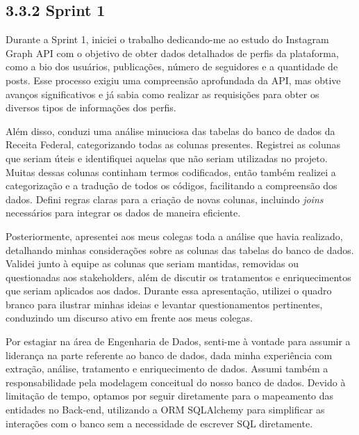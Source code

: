 \hypertarget{__RefHeading___Toc4787_3118176633}{}
\subsection*{3.3.2 Sprint 1}
\label{unit:ages-ii-sprint-1}

\indent Durante a Sprint 1, iniciei o trabalho dedicando-me ao estudo do Instagram Graph API com o objetivo de obter dados detalhados de perfis da plataforma, como a bio dos usuários, publicações, número de seguidores e a quantidade de posts. Esse processo exigiu uma compreensão aprofundada da API, mas obtive avanços significativos e já sabia como realizar as requisições para obter os diversos tipos de informações dos perfis.\par

\indent Além disso, conduzi uma análise minuciosa das tabelas do banco de dados da Receita Federal, categorizando todas as colunas presentes. Registrei as colunas que seriam úteis e identifiquei aquelas que não seriam utilizadas no projeto. Muitas dessas colunas continham termos codificados, então também realizei a categorização e a tradução de todos os códigos, facilitando a compreensão dos dados. Defini regras claras para a criação de novas colunas, incluindo \textit{joins} necessários para integrar os dados de maneira eficiente.\par

\indent Posteriormente, apresentei aos meus colegas toda a análise que havia realizado, detalhando minhas considerações sobre as colunas das tabelas do banco de dados. Validei junto à equipe as colunas que seriam mantidas, removidas ou questionadas aos stakeholders, além de discutir os tratamentos e enriquecimentos que seriam aplicados aos dados. Durante essa apresentação, utilizei o quadro branco para ilustrar minhas ideias e levantar questionamentos pertinentes, conduzindo um discurso ativo em frente aos meus colegas.\par

\indent Por estagiar na área de Engenharia de Dados, senti-me à vontade para assumir a liderança na parte referente ao banco de dados, dada minha experiência com extração, análise, tratamento e enriquecimento de dados. Assumi também a responsabilidade pela modelagem conceitual do nosso banco de dados. Devido à limitação de tempo, optamos por seguir diretamente para o mapeamento das entidades no Back-end, utilizando a ORM SQLAlchemy para simplificar as interações com o banco sem a necessidade de escrever SQL diretamente.\par

